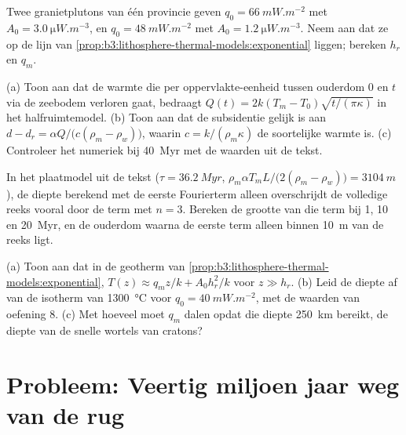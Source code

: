 \begin{exercise}[$\star\star$]\label{exo:b3:lithosphere-thermal-models:9}
Twee granietplutons van één provincie geven $q_0 = \qty{66}{mW.m^{-2}}$ met $A_0
= \qty{3.0}{\micro W.m^{-3}}$, en $q_0 = \qty{48}{mW.m^{-2}}$ met $A_0 =
\qty{1.2}{\micro W.m^{-3}}$. Neem aan dat ze op de lijn van
\cref{prop:b3:lithosphere-thermal-models:exponential} liggen; bereken $h_r$ en $q_m$.
\end{exercise}

\begin{exercise}[$\star\star\star$]\label{exo:b3:lithosphere-thermal-models:10}
(a) Toon aan dat de warmte die per oppervlakte-eenheid tussen ouderdom 0 en $t$
via de zeebodem verloren gaat, bedraagt $Q(t) = 2k(T_m - T_0)\sqrt{t/(\pi\kappa)}$ in het
halfruimtemodel. (b) Toon aan dat de subsidentie gelijk is aan $d - d_r = \alpha Q/\bigl(c(\rho_m -
\rho_w)\bigr)$, waarin $c = k/(\rho_m\kappa)$ de soortelijke warmte is. (c) Controleer het
numeriek bij \qty{40}{Myr} met de waarden uit de tekst.
\end{exercise}

\begin{exercise}[$\star\star\star$]\label{exo:b3:lithosphere-thermal-models:11}
In het plaatmodel uit de tekst ($\tau = \qty{36.2}{Myr}$, $\rho_m\alpha T_mL/
\bigl(2(\rho_m - \rho_w)\bigr) = \qty{3104}{m}$), de diepte berekend met de
eerste Fourierterm alleen overschrijdt de volledige reeks vooral door de term met $n = 3$.
Bereken de grootte van die term bij 1, 10 en \qty{20}{Myr}, en de ouderdom waarna
de eerste term alleen binnen \qty{10}{m} van de reeks ligt.
\end{exercise}

\begin{exercise}[$\star\star\star$]\label{exo:b3:lithosphere-thermal-models:12}
(a) Toon aan dat in de geotherm van \cref{prop:b3:lithosphere-thermal-models:exponential},
$T(z) \approx q_mz/k + A_0h_r^2/k$ voor $z \gg h_r$. (b) Leid de diepte af van de isotherm van
\qty{1300}{\celsius} voor $q_0 = \qty{40}{mW.m^{-2}}$, met de waarden van
oefening 8. (c) Met hoeveel moet $q_m$ dalen opdat die diepte
\qty{250}{km} bereikt, de diepte van de snelle wortels van cratons?
\end{exercise}

\section{Probleem: Veertig miljoen jaar weg van de rug}

